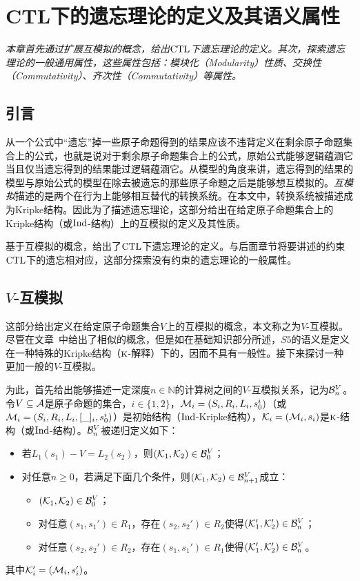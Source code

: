 
\chapter{CTL下的遗忘理论的定义及其语义属性}\label{chapter03}
{\em 本章首先通过扩展互模拟的概念，给出$\textrm{CTL}$下遗忘理论的定义。其次，探索遗忘理论的一般通用属性，这些属性包括：模块化（Modularity）性质、交换性（Commutativity）、齐次性（Commutativity）等属性。}

\section{引言}
从一个公式中“遗忘”掉一些原子命题得到的结果应该不违背定义在剩余原子命题集合上的公式，也就是说对于剩余原子命题集合上的公式，原始公式能够逻辑蕴涵它当且仅当遗忘得到的结果能过逻辑蕴涵它。从模型的角度来讲，遗忘得到的结果的模型与原始公式的模型在除去被遗忘的那些原子命题之后是能够想互模拟的。\emph{互模拟}描述的是两个在行为上能够相互替代的转换系统\cite{Baier:PMC:2008}。在本文中，转换系统被描述成为Kripke结构。因此为了描述遗忘理论，这部分给出在给定原子命题集合上的Kripke结构（或$\textrm{Ind}$-结构）上的互模拟的定义及其性质。

基于互模拟的概念，给出了$\textrm{CTL}$下遗忘理论的定义。与后面章节将要讲述的约束$\textrm{CTL}$下的遗忘相对应，这部分探索没有约束的遗忘理论的一般属性。

\section{$V$-互模拟}

这部分给出定义在给定原子命题集合$V$上的互模拟的概念，本文称之为$V$-互模拟。尽管在文章~\cite{Yan:AIJ:2009}中给出了相似的概念，但是如在基础知识部分所述，$S5$的语义是定义在一种特殊的Kripke结构（$\textsc{k}$-解释）下的，因而不具有一般性。接下来探讨一种更加一般的$V$-互模拟。

为此，首先给出能够描述一定深度$n\in \mathbb{N}$的计算树之间的$V$-互模拟关系，记为${\cal B}_n^V$。令$V\subseteq {\cal A}$是原子命题的集合，$i\in \{1,2\}$，${\cal M}_i=(S_i,R_i,L_i,s_0^i)$（或${\cal M}_i=(S_i,R_i,L_i,[\_]_i,s_0^i)$）是初始结构（$\textrm{Ind}$-Kripke结构），${\cal K}_i=({\cal M}_i, s_i)$是$\textsc{k}$-结构（或$\textrm{Ind}$-结构）。${\cal B}_n^V$被递归定义如下：
\begin{itemize}
	\item 若$L_1(s_1)-V=L_2(s_2)$，则$({\cal K}_1,{\cal K}_2) \in {\cal B}_0^V$；
	\item 对任意$n\ge 0$，若满足下面几个条件，则$({\cal K}_1,{\cal K}_2)\in {\cal B}_{n+1}^V$成立：
		\begin{itemize}
			\item $({\cal K}_1,{\cal K}_2) \in {\cal B}_0^V$；
			\item 对任意$(s_1,s_1')\in R_1$，存在$(s_2,s_2')\in R_2$使得$({\cal K}_1',{\cal K}_2') \in {\cal B}_n^V$；
			\item 对任意$(s_2,s_2')\in R_2$，存在$(s_1,s_1')\in R_1$使得$({\cal K}_1',{\cal K}_2') \in {\cal B}_n^V$。
		\end{itemize}
\end{itemize}
其中${\cal K}_i'=({\cal M}_i,s_i')$。


